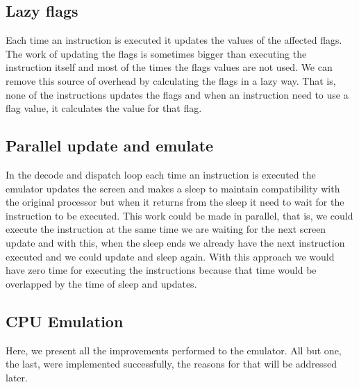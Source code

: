 \subsection{Lazy flags}
Each time an instruction is executed it updates the values of the affected flags. The work of updating the flags is sometimes bigger than executing the instruction itself and most of the times the flags values are not used. We can remove this source of overhead by calculating the flags in a lazy way. That is, none of the instructions updates the flags and when an instruction need to use a flag value, it calculates the value for that flag.

\subsection{Parallel update and emulate}
In the decode and dispatch loop each time an instruction is executed the emulator updates the screen and makes a sleep to maintain compatibility with the original processor but when it returns from the sleep it need to wait for the instruction to be executed. This work could be made in parallel, that is, we could execute the instruction at the same time we are waiting for the next screen update and with this, when the sleep ends we already have the next instruction executed and we could update and sleep again. With this approach we would have zero time for executing the instructions because that time would be overlapped by the time of sleep and updates.

\subsection{CPU Emulation}
Here, we present all the improvements performed to the emulator. All but one, the last, were implemented successfully, the reasons for that will be addressed later.

